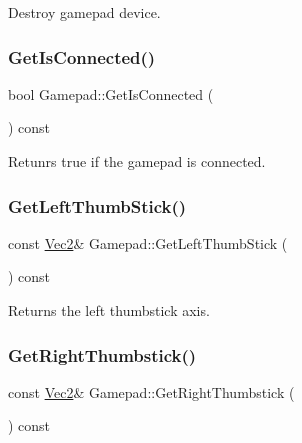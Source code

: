 Destroy gamepad device. \mbox{\label{class_gamepad_a78ca5ad8203c0c77e7a2b8782e780234}} 
\subsubsection{\texorpdfstring{Get\+Is\+Connected()}{GetIsConnected()}}
{\footnotesize\ttfamily bool Gamepad\+::\+Get\+Is\+Connected (\begin{DoxyParamCaption}{ }\end{DoxyParamCaption}) const\hspace{0.3cm}{\ttfamily [inline]}}

Retunrs true if the gamepad is connected. \mbox{\label{class_gamepad_ac1ae9a32b9f5e64a7a6bd0b05699b112}} 
\subsubsection{\texorpdfstring{Get\+Left\+Thumb\+Stick()}{GetLeftThumbStick()}}
{\footnotesize\ttfamily const \mbox{\hyperlink{struct_vec2}{Vec2}}\& Gamepad\+::\+Get\+Left\+Thumb\+Stick (\begin{DoxyParamCaption}{ }\end{DoxyParamCaption}) const\hspace{0.3cm}{\ttfamily [inline]}}

Returns the left thumbstick axis. \mbox{\label{class_gamepad_adbb39f23d58e544d26e11dcca0fd0134}} 
\subsubsection{\texorpdfstring{Get\+Right\+Thumbstick()}{GetRightThumbstick()}}
{\footnotesize\ttfamily const \mbox{\hyperlink{struct_vec2}{Vec2}}\& Gamepad\+::\+Get\+Right\+Thumbstick (\begin{DoxyParamCaption}{ }\end{DoxyParamCaption}) const\hspace{0.3cm}{\ttfamily [inline]}}

